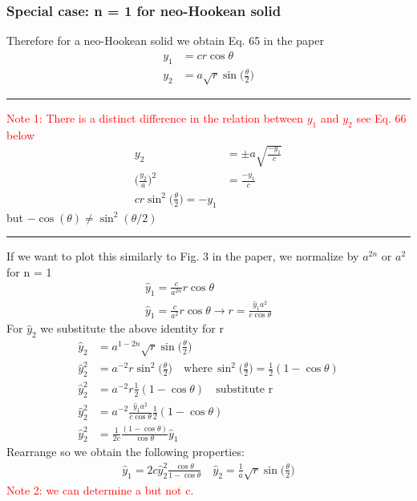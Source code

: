 \documentclass[12pt,3p]{article}
\numberwithin{equation}{section}
\begin{document}
\subsubsection{Special case: n = 1 for neo-Hookean solid}
Therefore for a neo-Hookean solid we obtain Eq. 65 in the paper
\begin{align*}
y_1 &= c r \cos \theta \\
y_2 &= a \sqrt{r} \sin \bigg( \frac{\theta}{2} \bigg)
\end{align*}
\noindent\rule{\linewidth}{0.5pt} %
\textcolor{red}{Note 1: There is a distinct difference in the relation between $y_1$ and $y_2$ see Eq. 66 below} 
\begin{align*}
y_2 &= \pm a \sqrt{\frac{- y_1}{c}} \\
\bigg( \frac{y_2}{a} \bigg)^2 &= \frac{-y_1}{c} \\
c r \sin^2 \bigg( \frac{\theta}{2} \bigg) = - y_1 
\end{align*}
but $ - \cos (\theta) \neq \sin^2 (\theta/2)$ \\
\noindent\rule{\linewidth}{0.5pt} %
If we want to plot this similarly to Fig. 3 in the paper, we normalize by $a^{2n}$ or $a^{2}$ for n = 1 
\begin{align*}
\hat{y}_1 = \frac{c}{a^{2n}} r \cos \theta \\
\hat{y}_1 = \frac{c}{a^2} r \cos \theta \rightarrow r = \frac{\hat{y}_1 a^2}{c \cos \theta}
\end{align*}
For $\hat{y}_2$ we substitute the above identity for r \\
\begin{align*}
\hat{y}_2 &= a^{1-2n} \sqrt{r} \sin \bigg( \frac{\theta}{2} \bigg) \\
\hat{y}_2^2 &= a^{-2} r \sin^2 \bigg( \frac{\theta}{2} \bigg) \quad \text{where} \, \sin^{2} \bigg( \frac{\theta}{2}\bigg) = \frac{1}{2} (1 - \cos \theta) \\
\hat{y}_2^2 &= a^{-2} r \frac{1}{2} (1 - \cos \theta) \quad \text{substitute r} \\
\hat{y}_2^2 &= a^{-2} \frac{\hat{y}_1 a^2}{c \cos \theta} \frac{1}{2} (1 - \cos \theta) \\
\hat{y}_2^2 &=  \frac{1}{2c} \frac{(1 - \cos \theta)}{\cos \theta} \hat{y}_1
\end{align*}
Rearrange so we obtain the following properties: 
\begin{align*}
\hat{y}_1 = 2 c \hat{y}_2^2 \frac{\cos \theta}{1 - \cos \theta} \quad \hat{y}_2 = \frac{1}{a}\sqrt{r} \sin \bigg( \frac{\theta}{2}\bigg) 
\end{align*}
\textcolor{red}{Note 2: we can determine a but not c.}
\end{document}
